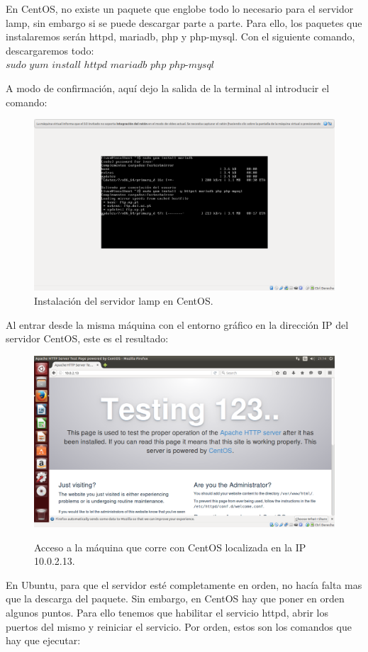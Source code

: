 \begin{itemize}
	
	En CentOS, no existe un paquete que englobe todo lo necesario para el servidor lamp, sin embargo si se puede descargar parte a parte. Para ello, los paquetes que instalaremos serán httpd, mariadb, php y php-mysql. Con el siguiente comando, descargaremos todo:\\
	
	$sudo$ $yum$ $install$ $httpd$ $mariadb$ $php$ $php$-$mysql$
	
	A modo de confirmación, aquí dejo la salida de la terminal al introducir el comando:\\
	
	\begin{figure}[H]
	\centering
	\includegraphics[width=0.7\linewidth]{instalar_lamp}
	\caption[Instalaciónlamp]{Instalación del servidor lamp en CentOS.}
	\label{fig:instalar_lamp}
	\end{figure}
	
	Al entrar desde la misma máquina con el entorno gráfico en la dirección IP del servidor CentOS, este es el resultado:\\
	
	\begin{figure}[H]
	\centering
	\includegraphics[width=0.7\linewidth]{AccesoWebCentos}
	\caption[AccesoWebCentos]{Acceso a la máquina que corre con CentOS localizada en la IP 10.0.2.13.}
	\caption{}
	\label{fig:Capturadepantallade2016-08-2121:14:39}
	\end{figure}

	
	En Ubuntu, para que el servidor esté completamente en orden, no hacía falta mas que la descarga del paquete. Sin embargo, en CentOS hay que poner en orden algunos puntos. Para ello tenemos que habilitar el servicio httpd, abrir los puertos del mismo y reiniciar el servicio. Por orden, estos son los comandos que hay que ejecutar:\\
	

\end{itemize}
